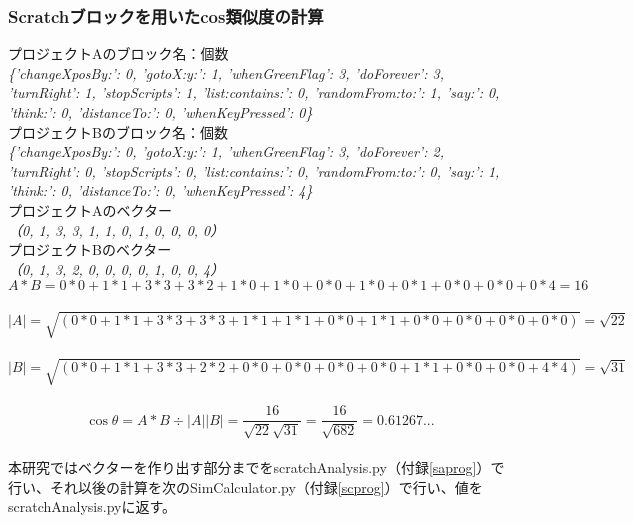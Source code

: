 \documentclass[a4paper,10pt,onecolumn,oneside,openany]{jsbook}
\begin{document}
\subsubsection{Scratchブロックを用いたcos類似度の計算}
プロジェクトAのブロック名：個数\\
{\sl \{'changeXposBy:': 0, 'gotoX:y:': 1,  'whenGreenFlag': 3, 'doForever': 3, 'turnRight': 1, 'stopScripts': 1, 'list:contains:': 0, 'randomFrom:to:': 1, 'say:': 0, 'think:': 0, 'distanceTo:': 0, 'whenKeyPressed': 0\}}\\
プロジェクトBのブロック名：個数\\
{\sl \{'changeXposBy:': 0, 'gotoX:y:': 1, 'whenGreenFlag': 3, 'doForever': 2, 'turnRight': 0, 'stopScripts': 0, 'list:contains:': 0, 'randomFrom:to:': 0, 'say:': 1, 'think:': 0, 'distanceTo:': 0, 'whenKeyPressed': 4\}}\\
プロジェクトAのベクター\\
{\sl（0, 1, 3, 3, 1, 1, 0, 1, 0, 0, 0, 0）}\\
プロジェクトBのベクター\\
{\sl（0, 1, 3, 2, 0, 0, 0, 0, 1, 0, 0, 4）}\\
\begin{equation}
A \ast B = 0 \ast 0 + 1 \ast 1 + 3 \ast 3 + 3 \ast 2 + 1 \ast 0 + 1 \ast 0 + 0 \ast 0 + 1 \ast 0 + 0 \ast 1 + 0 \ast 0 + 0 \ast 0 + 0 \ast 4 = 16
\end{equation}\\
\begin{equation}
|A| = \sqrt{( 0 \ast 0 + 1 \ast 1 + 3 \ast 3 + 3 \ast 3 + 1 \ast 1 + 1 \ast 1 + 0 \ast 0 + 1 \ast 1 + 0 \ast 0 + 0 \ast 0 + 0 \ast 0 + 0 \ast 0 )} = \sqrt{22}
\end{equation}\\
\begin{equation}
|B| = \sqrt{( 0 \ast 0 + 1 \ast 1 + 3 \ast 3 + 2 \ast 2 + 0 \ast 0 + 0 \ast 0 + 0 \ast 0 + 0 \ast 0 + 1 \ast 1 + 0 \ast 0 + 0 \ast 0 + 4 \ast 4 )} = \sqrt{31}
\end{equation}\\
\begin{equation}
\cos\theta = A \ast B \div |A| |B| = \frac{16}{\sqrt{22}\sqrt{31}} = \frac{16}{\sqrt{682}} = 0.61267...
\end{equation}\\
本研究ではベクターを作り出す部分までをscratchAnalysis.py（付録\ref{saprog}）で行い、それ以後の計算を次のSimCalculator.py（付録\ref{scprog}）で行い、値をscratchAnalysis.pyに返す。
\end{document}
